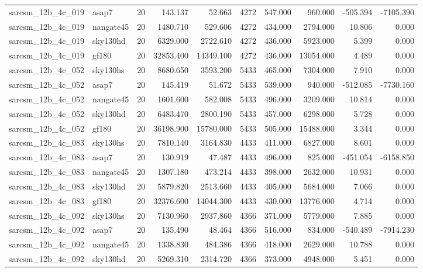 \begin{longtable}{llrrrrrrrr}
sarcsm\_12b\_4c\_019 & asap7 & 20 & 143.137 & 52.663 & 4272 & 547.000 & 960.000 & -505.394 & -7105.390 \\
sarcsm\_12b\_4c\_019 & nangate45 & 20 & 1480.710 & 529.606 & 4272 & 434.000 & 2794.000 & 10.806 & 0.000 \\
sarcsm\_12b\_4c\_019 & sky130hd & 20 & 6329.000 & 2722.610 & 4272 & 436.000 & 5923.000 & 5.399 & 0.000 \\
sarcsm\_12b\_4c\_019 & gf180 & 20 & 32853.400 & 14349.100 & 4272 & 436.000 & 13054.000 & 4.489 & 0.000 \\
sarcsm\_12b\_4c\_052 & sky130hs & 20 & 8680.650 & 3593.200 & 5433 & 465.000 & 7304.000 & 7.910 & 0.000 \\
sarcsm\_12b\_4c\_052 & asap7 & 20 & 145.419 & 51.672 & 5433 & 539.000 & 940.000 & -512.085 & -7730.160 \\
sarcsm\_12b\_4c\_052 & nangate45 & 20 & 1601.600 & 582.008 & 5433 & 496.000 & 3209.000 & 10.814 & 0.000 \\
sarcsm\_12b\_4c\_052 & sky130hd & 20 & 6483.470 & 2800.190 & 5433 & 457.000 & 6298.000 & 5.728 & 0.000 \\
sarcsm\_12b\_4c\_052 & gf180 & 20 & 36198.900 & 15780.000 & 5433 & 505.000 & 15488.000 & 3.344 & 0.000 \\
sarcsm\_12b\_4c\_083 & sky130hs & 20 & 7810.140 & 3164.830 & 4433 & 411.000 & 6827.000 & 8.601 & 0.000 \\
sarcsm\_12b\_4c\_083 & asap7 & 20 & 130.919 & 47.487 & 4433 & 496.000 & 825.000 & -451.054 & -6158.850 \\
sarcsm\_12b\_4c\_083 & nangate45 & 20 & 1307.180 & 473.214 & 4433 & 398.000 & 2632.000 & 10.931 & 0.000 \\
sarcsm\_12b\_4c\_083 & sky130hd & 20 & 5879.820 & 2513.660 & 4433 & 405.000 & 5684.000 & 7.066 & 0.000 \\
sarcsm\_12b\_4c\_083 & gf180 & 20 & 32376.600 & 14044.300 & 4433 & 430.000 & 13776.000 & 4.714 & 0.000 \\
sarcsm\_12b\_4c\_092 & sky130hs & 20 & 7130.960 & 2937.860 & 4366 & 371.000 & 5779.000 & 7.885 & 0.000 \\
sarcsm\_12b\_4c\_092 & asap7 & 20 & 135.490 & 48.464 & 4366 & 516.000 & 834.000 & -540.489 & -7914.230 \\
sarcsm\_12b\_4c\_092 & nangate45 & 20 & 1338.830 & 484.386 & 4366 & 418.000 & 2629.000 & 10.788 & 0.000 \\
sarcsm\_12b\_4c\_092 & sky130hd & 20 & 5269.310 & 2314.720 & 4366 & 373.000 & 4948.000 & 5.451 & 0.000 \\

\end{longtable}
